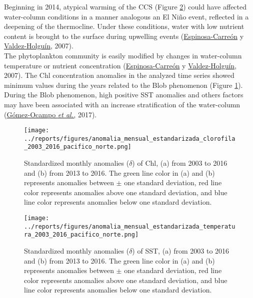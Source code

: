 \documentclass{article} %
\begin{document}
Beginning in 2014, atypical warming of the CCS (Figure \ref{fig:anomalies_sst}) could have affected water-column conditions in a manner analogous an El Niño event, reflected in a deepening of the thermocline. Under these conditions, water with low nutrient content is brought to the surface during upwelling events (\hyperlink{espinosa}{Espinosa-Carreón} y \hyperlink{espinosa}{Valdez-Holguín}, 2007).\\

The phytoplankton community is easily modified by changes in water-column temperature or nutrient concentration (\hyperlink{espinosa}{Espinosa-Carreón} y \hyperlink{espinosa}{Valdez-Holguín}, 2007). The Chl concentration anomalies in the analyzed time series showed minimum values during the years related to the Blob phenomenon (Figure \ref{fig:anomalies_chl}). During the Blob phenomenon, high positive SST anomalies and others factors may have been associated with an increase stratification of the water-column (\hyperlink{gomez}{Gómez-Ocampo \textit{et al.,}} 2017).\\

\begin{figure}
  \begin{center}
  \texttt{[image: ../reports/figures/anomalia\_mensual\_estandarizada\_clorofila\_2003\_2016\_pacifico\_norte.png]}
  \caption{Standardized monthly anomalies ($\delta$) of Chl, (a) from 2003 to 2016 and (b) from 2013 to 2016. The green line color in (a) and (b) represents anomalies between $\pm$ one standard deviation, red line color represents anomalies above one standard deviation, and blue line color represents anomalies below one standard deviation.}
  \label{fig:anomalies_chl}
  \end{center}
\end{figure}


\begin{figure}
  \begin{center}
  \texttt{[image: ../reports/figures/anomalia\_mensual\_estandarizada\_temperatura\_2003\_2016\_pacifico\_norte.png]}
  \caption{ Standardized monthly anomalies ($\delta$) of SST, (a) from 2003 to 2016 and (b) from 2013 to 2016. The green line color in (a) and (b) represents anomalies between $\pm$ one standard deviation, red line color represents anomalies above one standard deviation, and blue line color represents anomalies below one standard deviation.}
  \label{fig:anomalies_sst}
  \end{center}
\end{figure}
\end{document}
